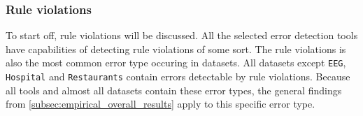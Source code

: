 \subsubsection{Rule violations}
To start off, rule violations will be discussed. All the selected error detection tools have capabilities of detecting rule violations of some sort. The rule violations is also the most common error type occuring in datasets. All datasets except \verb|EEG|, \verb|Hospital| and \verb|Restaurants| contain errors detectable by rule violations. 
Because all tools and almost all datasets contain these error types, the general findings from \autoref{subsec:empirical_overall_results} apply to this specific error type. 

